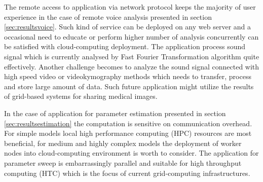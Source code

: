 The remote access to application via network protocol keeps the majority of user experience in the case of remote voice analysis presented in section \ref{sec:resultsvoice}. Such kind of service can be deployed on any web server and a occasional need to educate or perform higher number of analysis concurrently can be satisfied with cloud-computing deployment. The application process sound signal which is currently analysed by Fast Fourier Transformation algorithm quite effectively. Another challenge becomes to analyze the sound signal connected with high speed video or videokymography methods which needs to transfer, process and store large amount of data. Such future application might utilize the results of grid-based systems for sharing medical images.

In the case of application for parameter estimation presented in section \ref{sec:resultsestimation} the computation is sensitive on communication overhead. For simple models local high performance computing (HPC) resources are most beneficial, for medium and highly complex models the deployment of worker nodes into cloud-computing environment is worth to consider. The application for parameter sweep is embarrassingly parallel and suitable for high throughput computing (HTC) which is the focus of current grid-computing infrastructures. 

  
